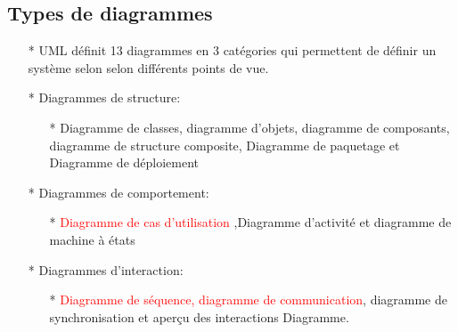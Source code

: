 \documentclass[12pt]{article}
\begin{document}
\subsection{Types de diagrammes}
\begin{itemize}
	\item [*] UML définit 13 diagrammes en 3 catégories qui permettent de définir un système selon
	selon différents points de vue.
	\item [*] Diagrammes de structure:
	\begin{itemize}
		\item[*] Diagramme de classes, diagramme d'objets, diagramme de composants, diagramme de structure composite,
		Diagramme de paquetage et Diagramme de déploiement
	\end{itemize}
\item [*] Diagrammes de comportement:
\begin{itemize}
	\item[*] \textcolor{red}{Diagramme de cas d'utilisation} ,Diagramme d'activité et diagramme de machine à états
\end{itemize}
\item [*] Diagrammes d'interaction:
\begin{itemize}
	\item [*]  \textcolor{red}{Diagramme de séquence, diagramme de communication}, diagramme de synchronisation et aperçu des interactions
	Diagramme.
\end{itemize}
\end{itemize}
\end{document}
